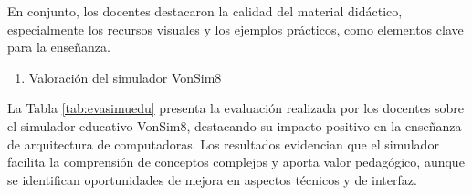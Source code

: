 \documentclass[12pt,oneside]{templates/unerthesis}
\providecommand{\tightlist}{%
  \setlength{\itemsep}{0pt}\setlength{\parskip}{0pt}}
\begin{document}
\begin{table}[!h]
\centering
\caption{\label{tab:tablaevaluaciondocentes}Evaluación de aspectos clave por los docentes}
\centering
{}
\end{table}

En conjunto, los docentes destacaron la calidad del material didáctico, especialmente los recursos visuales y los ejemplos prácticos, como elementos clave para la enseñanza.

\begin{enumerate}
\def\labelenumi{\arabic{enumi}.}
\setcounter{enumi}{2}
\tightlist
\item
  Valoración del simulador VonSim8
\end{enumerate}

La Tabla \ref{tab:evasimuedu} presenta la evaluación realizada por los docentes sobre el simulador educativo VonSim8, destacando su impacto positivo en la enseñanza de arquitectura de computadoras. Los resultados evidencian que el simulador facilita la comprensión de conceptos complejos y aporta valor pedagógico, aunque se identifican oportunidades de mejora en aspectos técnicos y de interfaz.
\end{document}
